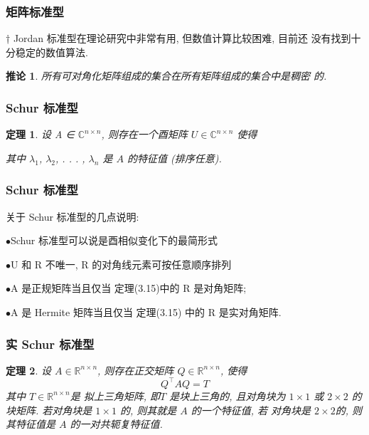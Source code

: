 \documentclass[notheorems,serif]{beamer}
\newcommand{\hei}[1]{{\HEI#1}}
\newtheorem{theorem}{\hei{定理}}
\newtheorem{corollary}{\hei{推论}}
\begin{document}
\begin{frame}
\frametitle{矩阵标准型}
† Jordan 标准型在理论研究中非常有用, 但数值计算比较困难, 目前还
没有找到十分稳定的数值算法.



\begin{corollary}
	所有可对角化矩阵组成的集合在所有矩阵组成的集合中是稠密
	的.
\end{corollary}
\end{frame}

\begin{frame}
\frametitle{Schur 标准型}
\begin{theorem}
	设 A ∈ $\mathbb{C}^{n×n}$, 则存在一个酉矩阵 $U ∈\mathbb{C}^{n×n}$ 使得	
	
	其中 $\lambda_1$, $\lambda_2$, . . . , $\lambda_n$ 是 $A$ 的特征值 (排序任意).
\end{theorem}
\end{frame}

\begin{frame}
\frametitle{Schur 标准型}
关于 Schur 标准型的几点说明:

$\bullet$Schur 标准型可以说是酉相似变化下的最简形式

$\bullet$U 和 R 不唯一, R 的对角线元素可按任意顺序排列

$\bullet$A 是正规矩阵当且仅当 定理(3.15)中的 R 是对角矩阵;

$\bullet$A 是 Hermite 矩阵当且仅当 定理(3.15) 中的 R 是实对角矩阵.
\end{frame}

\begin{frame}
\frametitle{实 Schur 标准型}
\begin{theorem}
	设 $A ∈ \mathbb{R}^{n×n}$, 则存在正交矩阵 $Q ∈ \mathbb{R}^{n×n}$, 使得
	$$
	Q^{\top} A Q=T
	$$
	其中 $T ∈ \mathbb{R}^{n×n}$是 拟上三角矩阵, 即$ T$ 是块上三角的, 且对角块为 $1 × 1$
	或 $2 × 2$ 的块矩阵. 若对角块是 $1 × 1$ 的, 则其就是 $A$ 的一个特征值, 若
	对角块是 $2 × 2 $的, 则其特征值是 $A$ 的一对共轭复特征值.
\end{theorem}
\end{frame}
\end{document}
